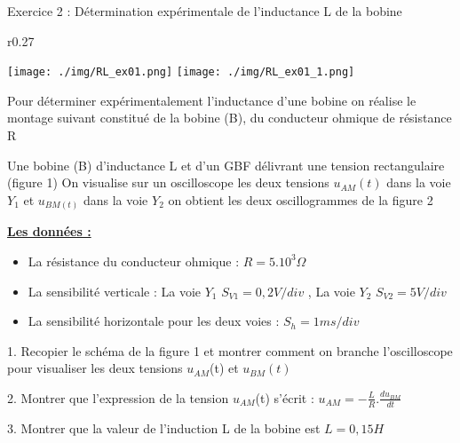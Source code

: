 \documentclass[12pt, french]{article}
\begin{document}
\begin{Box2}{Exercice 2 :  Détermination expérimentale de l'inductance L de la bobine }
	\begin{wrapfigure}[10]{r}{0.27\textwidth}
  \begin{center}
	\texttt{[image: ./img/RL\_ex01.png]}
	\texttt{[image: ./img/RL\_ex01\_1.png]}
  \end{center}
\end{wrapfigure}
Pour déterminer expérimentalement l’inductance d’une bobine on réalise le
montage suivant constitué de la bobine (B), du conducteur ohmique de
résistance R

Une bobine (B) d’inductance L et d’un GBF délivrant une tension
rectangulaire (figure 1) On visualise sur un oscilloscope les deux tensions
$u_{AM}(t)$ dans la voie $Y_1$ et $u_{BM(t)}$ dans la voie $Y_2$ on obtient les deux
oscillogrammes de la figure 2

\underline{\textbf{Les données :  }}

\begin{itemize}
	\item La résistance du conducteur ohmique : $R=5.10^3 \Omega$
	\item La sensibilité verticale :  La voie $Y_1$ $S_{V1}=0,2V/div$ , La voie $Y_2$ $S_{V2}=5V/div$
	\item La sensibilité horizontale pour les deux voies : $S_h=1ms/div$

\end{itemize}

1. Recopier le schéma de la figure 1 et montrer comment on
branche l’oscilloscope pour visualiser les deux tensions $u_{AM}$(t) et $u_{BM}(t)$

2. Montrer que l’expression de la tension $u_{AM}$(t) s’écrit : $u_{AM} = -\frac{L}{R}.\frac{du_{BM}}{dt}$

3. Montrer que la valeur de l’induction L de la bobine est $L=0,15H$
\end{Box2}
\end{document}
